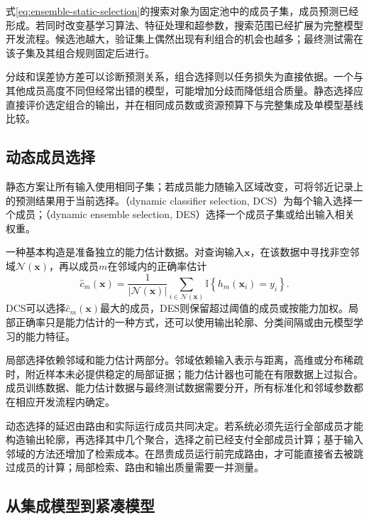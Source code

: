 式\eqref{eq:ensemble-static-selection}的搜索对象为固定池中的成员子集，成员预测已经形成。若同时改变基学习算法、特征处理和超参数，搜索范围已经扩展为完整模型开发流程。候选池越大，验证集上偶然出现有利组合的机会也越多；最终测试需在该子集及其组合规则固定后进行。

分歧和误差协方差可以诊断预测关系，组合选择则以任务损失为直接依据。一个与其他成员高度不同但经常出错的模型，可能增加分歧而降低组合质量。静态选择应直接评价选定组合的输出，并在相同成员数或资源预算下与完整集成及单模型基线比较。

\subsection{动态成员选择}
\label{sec:ensemble-dynamic-selection}

静态方案让所有输入使用相同子集；若成员能力随输入区域改变，可将邻近记录上的预测结果用于当前选择。（dynamic classifier selection, DCS）为每个输入选择一个成员；（dynamic ensemble selection, DES）选择一个成员子集或给出输入相关权重。

一种基本构造是准备独立的能力估计数据。对查询输入$\bm{x}$，在该数据中寻找非空邻域$\mathcal{N}(\bm{x})$，再以成员$m$在邻域内的正确率估计
\begin{equation}
  \widehat{c}_m(\bm{x})
  =
  \frac{1}{|\mathcal{N}(\bm{x})|}
  \sum_{i\in\mathcal{N}(\bm{x})}
  \mathbb{I}\!\left\{h_m(\bm{x}_i)=y_i\right\}.
  \label{eq:ensemble-local-competence}
\end{equation}
DCS可以选择$\widehat{c}_m(\bm{x})$最大的成员，DES则保留超过阈值的成员或按能力加权。局部正确率只是能力估计的一种方式，还可以使用输出轮廓、分类间隔或由元模型学习的能力特征。

局部选择依赖邻域和能力估计两部分。邻域依赖输入表示与距离，高维或分布稀疏时，附近样本未必提供稳定的局部证据；能力估计器也可能在有限数据上过拟合。成员训练数据、能力估计数据与最终测试数据需要分开，所有标准化和邻域参数都在相应开发流程内确定。

动态选择的延迟由路由和实际运行成员共同决定。若系统必须先运行全部成员才能构造输出轮廓，再选择其中几个聚合，选择之前已经支付全部成员计算；基于输入邻域的方法还增加了检索成本。在昂贵成员运行前完成路由，才可能直接省去被跳过成员的计算；局部检索、路由和输出质量需要一并测量。

\subsection{从集成模型到紧凑模型}
\label{sec:ensemble-compression}


